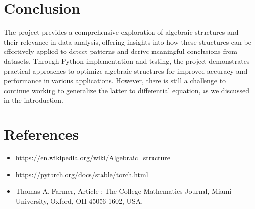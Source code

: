 \documentclass{article}
\begin{document}
\section{Conclusion}
    The project provides a comprehensive 
    exploration of algebraic structures and
    their relevance in data analysis, 
    offering insights into how these 
    structures can be effectively applied 
    to detect patterns and derive meaningful
    conclusions from datasets. Through Python 
    implementation and testing, the project 
    demonstrates practical approaches to 
    optimize algebraic structures for 
    improved accuracy and performance 
    in various applications. However, there is still a 
    challenge to continue working to generalize the latter to 
    differential equation, as we discussed in the introduction.



    \section{References}

        \begin{itemize}
            \item \url{https://en.wikipedia.org/wiki/Algebraic_structure}
            \item \url{https://pytorch.org/docs/stable/torch.html}
            \item Thomas A. Farmer, Article : The College Mathematics Journal, Miami University, Oxford, OH 45056-1602, USA. 
        \end{itemize}


    
\end{document}
